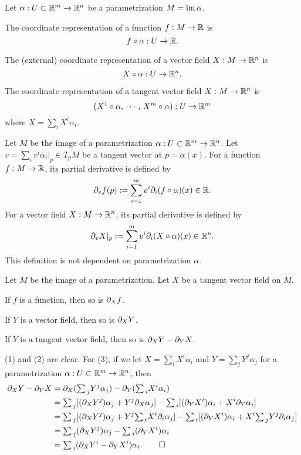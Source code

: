 \documentclass{../note}
\def\a{\alpha}
\def\ssum{{\textstyle\sum\,}}
\begin{document}
\begin{defn}
Let $\a:U\subset\R^m\to\R^n$ be a parametrization $M=\im\a$.
\begin{parts}
\item The coordinate representation of a function $f:M\to\mathbb{R}$ is
\[f\circ\a:U\to\R.\]
\item The (external) coordinate representation of a vector field $X:M\to\mathbb{R}^n$ is
\[X\circ\a:U\to\R^n.\]
\item The coordinate representation of a tangent vector field $X:M\to\mathbb{R}^n$ is
\[(X^1\circ\a,\,\cdots,\,X^m\circ\a):U\to\R^m\]
where $X=\sum_iX^i\a_i$.
\end{parts}
\end{defn}



\begin{defn}
Let $M$ be the image of a parametrization $\a:U\subset\R^m\to\R^n$.
Let $v=\sum_iv^i\a_i|_p\in T_pM$ be a tangent vector at $p=\a(x)$.
For a function $f:M\to\mathbb{R}$, its partial derivative is defined by
\[\pd_vf(p):=\sum_{i=1}^mv^i\pd_i(f\circ\a)(x)\in\R.\]
For a vector field $X:M\to\mathbb{R}^n$, its partial derivative is defined by
\[\pd_vX|_p:=\sum_{i=1}^mv^i\pd_i(X\circ\a)(x)\in\R^n.\]
This definition is not dependent on parametrization $\a$.
\end{defn}

\begin{prop}
Let $M$ be the image of a parametrization.
Let $X$ be a tangent vector field on $M$.
\begin{parts}
\item If $f$ is a function, then so is $\pd_Xf$.
\item If $Y$ is a vector field, then so is $\pd_XY$.
\item If $Y$ is a tangent vector field, then so is $\pd_XY-\pd_YX$.
\end{parts}
\end{prop}
\begin{pf}
(1) and (2) are clear.
For (3), if we let $X=\sum_iX^i\a_i$ and $Y=\sum_jY^j\a_j$ for a parametrization $\a:U\subset\R^m\to\R^n$, then
\begin{align*}
\pd_XY-\pd_YX
&=\pd_X(\ssum_jY^j\a_j)-\pd_Y(\ssum_iX^i\a_i)\\
&=\ssum_j[(\pd_XY^j)\a_j+Y^j\pd_X\a_j]-\ssum_i[(\pd_YX^i)\a_i+X^i\pd_Y\a_i]\\
&=\ssum_j[(\pd_XY^j)\a_j+Y^j\ssum_iX^i\pd_i\a_j]-\ssum_i[(\pd_YX^i)\a_i+X^i\ssum_jY^j\pd_i\a_j]\\
&=\ssum_j(\pd_XY^j)\a_j-\ssum_i(\pd_YX^i)\a_i\\
&=\ssum_i(\pd_XY^i-\pd_YX^i)\a_i.\qedhere
\end{align*}
\end{pf}
\end{document}

